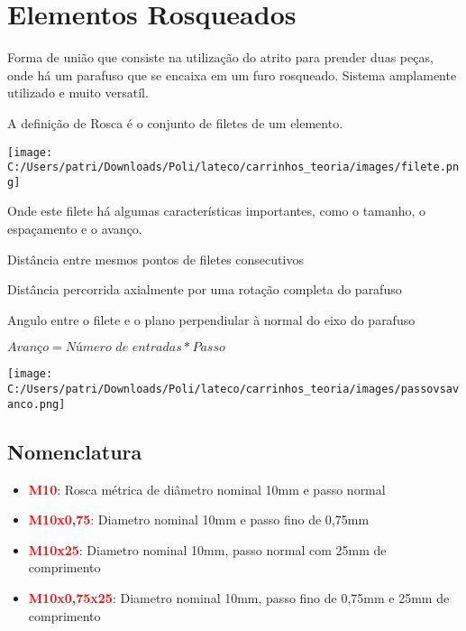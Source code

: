\section{Elementos Rosqueados}

Forma de união que consiste na utilização do atrito para prender duas peças, onde há um parafuso que se encaixa em um furo rosqueado. Sistema amplamente utilizado e muito versatíl.

\begin{namedtheorem}[Rosca]
	A definição de Rosca é o conjunto de filetes de um elemento.
	\begin{center}
	\texttt{[image: C:/Users/patri/Downloads/Poli/lateco/carrinhos\_teoria/images/filete.png]}\\
	\end{center}
	Onde este filete há algumas características importantes, como o tamanho, o espaçamento e o avanço.
\end{namedtheorem}

\begin{namedtheorem}[Passo]
	Distância entre mesmos pontos de filetes consecutivos
\end{namedtheorem}

\begin{namedtheorem}[Avanço]
	Distância percorrida axialmente por uma rotação completa do parafuso
\end{namedtheorem}

\begin{namedtheorem}
	Angulo entre o filete e o plano perpendiular à normal do eixo do parafuso
\end{namedtheorem}

\begin{namedtheorem}[Avanço]
	$\textit{Avanço} = \textit{Número de entradas}*\textit{Passo}$
\end{namedtheorem}

\begin{center}
\texttt{[image: C:/Users/patri/Downloads/Poli/lateco/carrinhos\_teoria/images/passovsavanco.png]}\\
\end{center}

\subsection{Nomenclatura}

\begin{itemize}
	\item \textbf{\textcolor{red}{M10}}: Rosca métrica de diâmetro nominal 10mm e passo normal
	\item \textbf{\textcolor{red}{M10x0,75}}: Diametro nominal 10mm e passo fino de 0,75mm
	\item \textbf{\textcolor{red}{M10x25}}: Diametro nominal 10mm, passo normal com 25mm de comprimento
	\item \textbf{\textcolor{red}{M10x0,75x25}}: Diametro nominal 10mm, passo fino de 0,75mm e 25mm de comprimento
\end{itemize}

